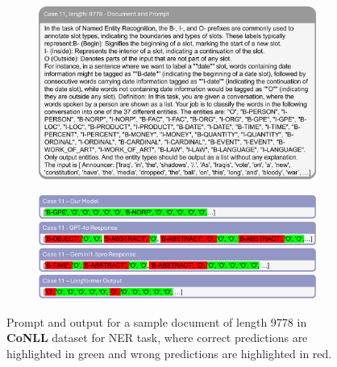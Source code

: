 \documentclass[11pt]{article}
\begin{document}
\begin{figure}[!h]
    \centering
    \begin{subfigure}[b]{1.0\linewidth}   
        \includegraphics[width=\textwidth]{images/case11_prompt.png} %
    \end{subfigure}
    \vspace{1pt}
    \begin{subfigure}[b]{1.0\linewidth}  
        \includegraphics[width=\textwidth]{images/case11_ans.png}
    \end{subfigure}
    \caption{Prompt and output for a sample document of length 9778 in \textbf{CoNLL} dataset for NER task, where correct predictions are highlighted in green and wrong predictions are highlighted in red.}
    \label{case11}
\end{figure}
\end{document}
